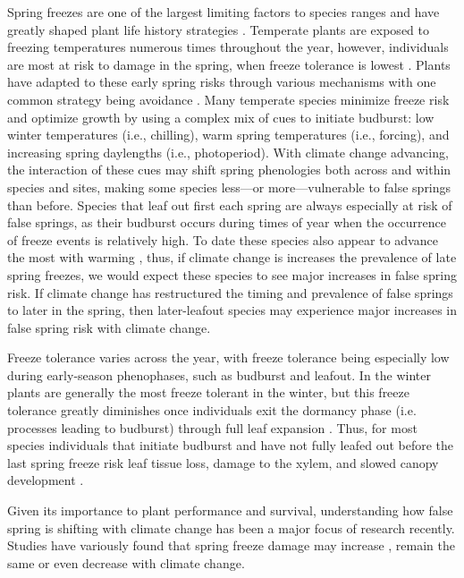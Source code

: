 \documentclass{article}\usepackage[]{graphicx}\usepackage[]{color}
\begin{document}
Spring freezes are one of the largest limiting factors to species ranges and have greatly shaped plant life history strategies \citep{Kollas2014}. Temperate plants are exposed to freezing temperatures numerous times throughout the year, however, individuals are most at risk to damage in the spring, when freeze tolerance is lowest \citep{Sakai1987}. Plants have adapted to these early spring risks through various mechanisms with one common strategy being avoidance \citep{Vitasse2014}. Many temperate species minimize freeze risk and optimize growth by using a complex mix of cues to initiate budburst: low winter temperatures (i.e., chilling), warm spring temperatures (i.e., forcing), and increasing spring daylengths (i.e., photoperiod). With climate change advancing, the interaction of these cues may shift spring phenologies both across and within species and sites, making some species less---or more---vulnerable to false springs than before. Species that leaf out first each spring are always especially at risk of false springs, as their budburst occurs during times of year when the occurrence of freeze events is relatively high. To date these species also appear to advance the most with warming  \citep{Wolkovich2012}, thus, if climate change is increases the prevalence of late spring freezes, we would expect these species to see major increases in false spring risk. If climate change has restructured the timing and prevalence of false springs to later in the spring, then later-leafout species may experience major increases in false spring risk with climate change. 
 
Freeze tolerance varies across the year, with freeze tolerance being especially low during early-season phenophases, such as budburst and leafout. In the winter plants are generally the most freeze tolerant in the winter, but this freeze tolerance greatly diminishes once individuals exit the dormancy phase (i.e. processes leading to budburst) through full leaf expansion \citep{Lenz2016, Vitasse2014}. Thus, for most species individuals that initiate budburst and have not fully leafed out before the last spring freeze risk leaf tissue loss, damage to the xylem, and slowed canopy development \citep{Gu2008, Hufkens2012}.

Given its importance to plant performance and survival, understanding how false spring is shifting with climate change has been a major focus of research recently. Studies have variously found that spring freeze damage may increase \citep{Augspurger2013, Hannenin1991, Labe2016}, remain the same \citep{Scheifinger2003} or even decrease \citep{Kramer1994, Vitra2017} with climate change. 
\end{document}
